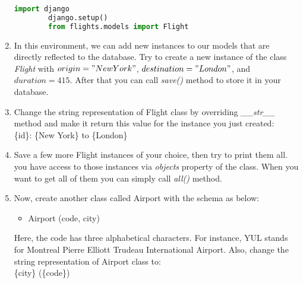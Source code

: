 \documentclass{homework}
\begin{document}
\begin{enumerate}[label=\roman*)]
    \begin{lstlisting}[language=python]
        import django
        django.setup()
        from flights.models import Flight
\end{lstlisting}
    \item In this environment, we can add new instances to our models that are directly reflected to the database.
    Try to create a new instance of the class \textit{Flight} with $origin="New York"$, $destination="London"$, and $duration=415$. After that you can call \textit{save()} method to store it in your database.
    \item Change the string representation of Flight class by overriding \textit{\_\_str\_\_} method and make it return this value for the instance you just created: \\
    \{id\}: \{New York\} to \{London\}
    \item Save a few more Flight instances of your choice, then try to print them all.
    you have access to those instances via \textit{objects} property of the class. When you want to get all of them you can simply call \textit{all()} method.

    \item Now, create another class called Airport with the schema as below:
    \begin{itemize}
        \item Airport (code, city)
    \end{itemize}
    Here, the code has three alphabetical characters. For instance, YUL stands for Montreal Pierre Elliott Trudeau International Airport. Also, change the string representation of Airport class to: \\
    \{city\} (\{code\})


\end{enumerate}
\end{document}
